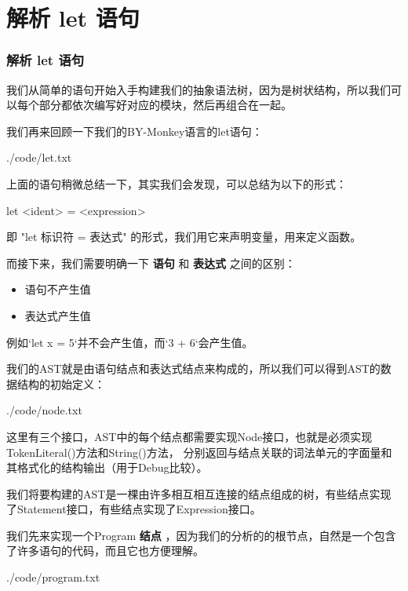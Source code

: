 \documentclass{beamer}
\begin{document}
	\section{解析 let 语句}
	\begin{frame}
		\frametitle{解析 let 语句}
		我们从简单的语句开始入手构建我们的抽象语法树，因为是树状结构，所以我们可以每个部分都依次编写好对应的模块，然后再组合在一起。
		
		我们再来回顾一下我们的BY-Monkey语言的let语句：
			
		
		{./code/let.txt}
		
		
		上面的语句稍微总结一下，其实我们会发现，可以总结为以下的形式：

		let <ident> = <expression>
		
		
		即 "let 标识符 = 表达式" 的形式，我们用它来声明变量，用来定义函数。
	\end{frame}
	\begin{frame}
		
		而接下来，我们需要明确一下 \textbf{语句} 和 \textbf{表达式} 之间的区别：
		
		\begin{itemize}
			\item 语句不产生值
			\item 表达式产生值
		\end{itemize}
		
		例如`let x = 5`并不会产生值，而`3 + 6`会产生值。
		
		
		我们的AST就是由语句结点和表达式结点来构成的，所以我们可以得到AST的数据结构的初始定义：
	\end{frame}
	\begin{frame}	
		
		{./code/node.txt}
		
		
		这里有三个接口，AST中的每个结点都需要实现Node接口，也就是必须实现TokenLiteral()方法和String()方法，
		分别返回与结点关联的词法单元的字面量和其格式化的结构输出（用于Debug比较）。
		
		我们将要构建的AST是一棵由许多相互相互连接的结点组成的树，有些结点实现了Statement接口，有些结点实现了Expression接口。
	\end{frame}
	\begin{frame}
		我们先来实现一个Program \textbf{结点} ，因为我们的分析的的根节点，自然是一个包含了许多语句的代码，而且它也方便理解。
		
		
		{./code/program.txt}
		
	\end{frame}
\end{document}
